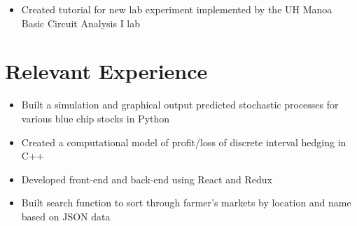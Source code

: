 \documentclass{resume}
\begin{document}
\begin{itemize}[noitemsep,nolistsep]
  \item Created tutorial for new lab experiment implemented by the UH Manoa Basic Circuit Analysis I lab
\end{itemize}

\section{%
Relevant Experience}

\begin{itemize}[noitemsep,nolistsep]
  \item Built a simulation and graphical output predicted stochastic processes for various blue chip stocks in Python 
  \item Created a computational model of profit/loss of discrete interval hedging in C++ 
\end{itemize}

\begin{itemize}[noitemsep,nolistsep]
  \item Developed front-end and back-end using React and Redux 
  \item Built search function to sort through farmer's markets by location and name based on JSON data
\end{itemize}

\end{document}
